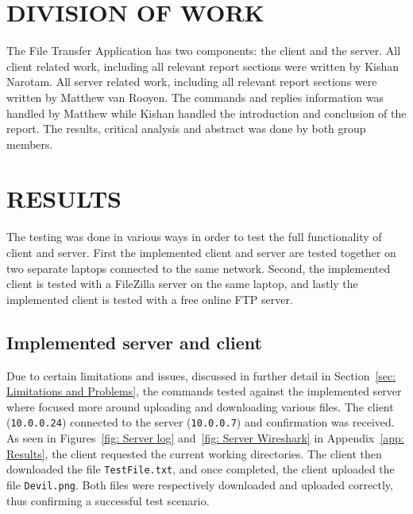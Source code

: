 \documentclass[10pt,twocolumn]{witseiepaper}
\def\code#1{\texttt{#1}}
\begin{document}
%
\section{DIVISION OF WORK}
\label{sec: Division of Work}
The File Transfer Application has two components: the client and the server. All client related work, including all relevant report sections were written by Kishan Narotam. All server related work, including all relevant report sections were written by Matthew van Rooyen. The commands and replies information was handled by Matthew while Kishan handled the introduction and conclusion of the report. The results, critical analysis and abstract was done by both group members.

%
\section{RESULTS}
\label{sec: Results}
The testing was done in various ways in order to test the full functionality of client and server. First the implemented client and server are tested together on two separate laptops connected to the same network. Second, the implemented client is tested with a FileZilla server on the same laptop, and lastly the implemented client is tested with a free online FTP server.

\subsection{Implemented server and client}
\label{sec: Results implemented server}
Due to certain limitations and issues, discussed in further detail in Section~\ref{sec: Limitations and Problems}, the commands tested against the implemented server where focused more around uploading and downloading various files. The client (\code{10.0.0.24}) connected to the server (\code{10.0.0.7}) and confirmation was received. As seen in Figures~\ref{fig: Server log} and~\ref{fig: Server Wireshark} in Appendix~\ref{app: Results}, the client requested the current working directories. The client then downloaded the file \code{TestFile.txt}, and once completed, the client uploaded the file \code{Devil.png}. Both files were respectively downloaded and uploaded correctly, thus confirming a successful test scenario.
\end{document}
